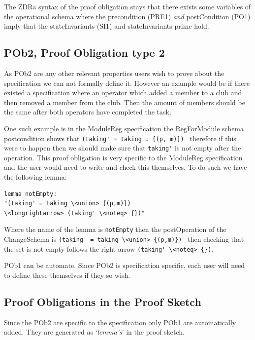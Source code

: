  The ZDRa syntax of the proof obligation stays that there exists some variables
 of the operational schema where the precondition (PRE1) \emph{and}
 postCondition (PO1) imply that the stateInvariants (SI1) and stateInvariants
 prime hold.

\subsection{POb2, Proof Obligation type 2}

As POb2 are any other relevant properties users wish to prove about the
specification we can not formally define it. However an example would be if
there existed a specification where an operator which added a member to a club
and then removed a member from the club. Then the amount of members should be
the same after both operators have completed the task.

One such example is in the ModuleReg specification the RegForModule schema
postcondition shows that \verb|(taking' = taking ∪ {(p, m)}) | therefore if this
were to happen then we should make sure that \verb|taking'| is not empty after
the operation. This proof obligation is very specific to the ModuleReg
specification and the user would need to write and check this themselves. To do
such we have the following lemma:

\begin{verbatim}
lemma notEmpty:
"(taking' = taking \<union> {(p,m)}) 
\<longrightarrow> (taking' \<noteq> {})"
\end{verbatim}

Where the name of the lemma is \verb|notEmpty| then the postOperation of the
ChangeSchema is \verb|(taking' = taking \<union> {(p,m)}) | then checking that
the set is not empty follows the right arrow \verb|(taking' \<noteq> {})|.

POb1 can be automate. Since POb2 is specification specific, each user will need
to define these themselves if they so wish.

\subsection{Proof Obligations in the Proof Sketch}

Since the POb2 are specific to the specification only POb1 are automatically
added. They are generated as `\emph{lemma's}' in the proof sketch. 


